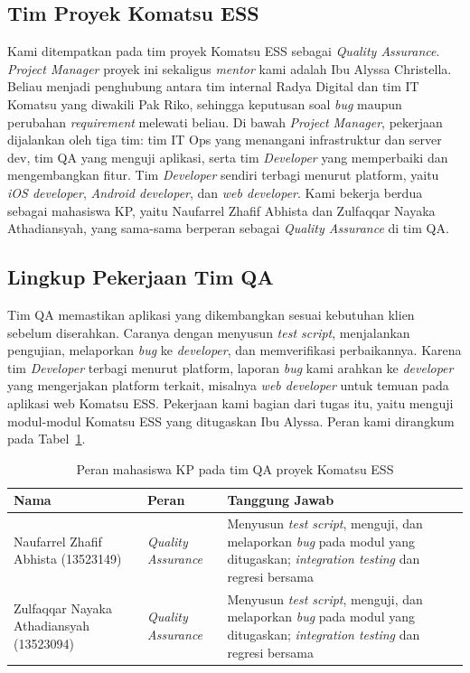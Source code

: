 \subsection{Tim Proyek Komatsu ESS}
Kami ditempatkan pada tim proyek Komatsu ESS sebagai \textit{Quality Assurance}. \textit{Project Manager} proyek ini sekaligus \textit{mentor} kami adalah Ibu Alyssa Christella. Beliau menjadi penghubung antara tim internal Radya Digital dan tim IT Komatsu yang diwakili Pak Riko, sehingga keputusan soal \textit{bug} maupun perubahan \textit{requirement} melewati beliau. Di bawah \textit{Project Manager}, pekerjaan dijalankan oleh tiga tim: tim IT Ops yang menangani infrastruktur dan server dev, tim QA yang menguji aplikasi, serta tim \textit{Developer} yang memperbaiki dan mengembangkan fitur. Tim \textit{Developer} sendiri terbagi menurut platform, yaitu \textit{iOS developer}, \textit{Android developer}, dan \textit{web developer}. Kami bekerja berdua sebagai mahasiswa KP, yaitu Naufarrel Zhafif Abhista dan Zulfaqqar Nayaka Athadiansyah, yang sama-sama berperan sebagai \textit{Quality Assurance} di tim QA.

\subsection{Lingkup Pekerjaan Tim QA}
Tim QA memastikan aplikasi yang dikembangkan sesuai kebutuhan klien sebelum diserahkan. Caranya dengan menyusun \textit{test script}, menjalankan pengujian, melaporkan \textit{bug} ke \textit{developer}, dan memverifikasi perbaikannya. Karena tim \textit{Developer} terbagi menurut platform, laporan \textit{bug} kami arahkan ke \textit{developer} yang mengerjakan platform terkait, misalnya \textit{web developer} untuk temuan pada aplikasi web Komatsu ESS. Pekerjaan kami bagian dari tugas itu, yaitu menguji modul-modul Komatsu ESS yang ditugaskan Ibu Alyssa. Peran kami dirangkum pada Tabel~\ref{tab:peran-kp}.

\begin{table}[H]
\caption{Peran mahasiswa KP pada tim QA proyek Komatsu ESS}
\label{tab:peran-kp}
\centering
\begin{tabularx}{\textwidth}{|p{4.2cm}|p{2.6cm}|X|}
\hline
\textbf{Nama} & \textbf{Peran} & \textbf{Tanggung Jawab} \\
\hline
Naufarrel Zhafif Abhista (13523149) & \textit{Quality Assurance} & Menyusun \textit{test script}, menguji, dan melaporkan \textit{bug} pada modul yang ditugaskan; \textit{integration testing} dan regresi bersama \\
\hline
Zulfaqqar Nayaka Athadiansyah (13523094) & \textit{Quality Assurance} & Menyusun \textit{test script}, menguji, dan melaporkan \textit{bug} pada modul yang ditugaskan; \textit{integration testing} dan regresi bersama \\
\hline
\end{tabularx}
\end{table}

